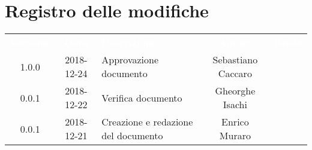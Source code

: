 \section*{Registro delle modifiche}
{
	\renewcommand{\arraystretch}{1.5}
	\centering
	\begin{longtable}{ c c  C{4cm}  c  c }
		
		\textcolor{white}{\textbf{Versione}} & \textcolor{white}{\textbf{Data}} & \textcolor{white}{\textbf{Descrizione}} & \textcolor{white}{\textbf{Autore}} & \textcolor{white}{\textbf{Ruolo}}\\	
		
		1.0.0 & 2018-12-24 & Approvazione documento & Sebastiano Caccaro & \Res{} \\
		
		0.0.1 & 2018-12-22 & Verifica documento & Gheorghe Isachi & \ver{} \\
		
		0.0.1 & 2018-12-21 & Creazione e redazione del documento & Enrico Muraro & \reda{} \\
		
	\end{longtable}

}